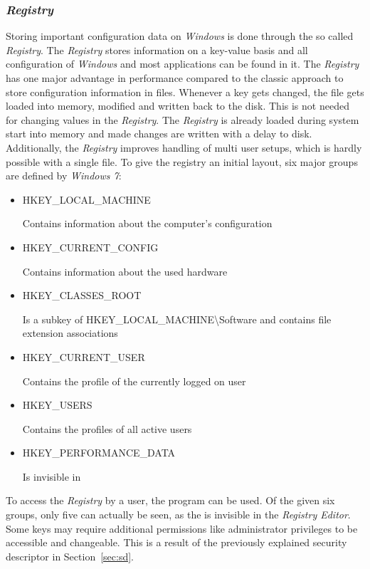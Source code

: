 \subsubsection{\emph{Registry}}
Storing important configuration data on \emph{Windows} is done through the so called \emph{Registry}. The \emph{Registry} stores information on a key-value basis and all configuration of \emph{Windows} and most applications can be found in it. The \emph{Registry} has one major advantage in performance compared to the classic approach to store configuration information in  files. Whenever a key gets changed, the  file gets loaded into memory, modified and written back to the disk. This is not needed for changing values in the \emph{Registry}. The \emph{Registry} is already loaded during system start into memory and made changes are written with a delay to disk. Additionally, the \emph{Registry} improves handling of multi user setups, which is hardly possible with a single  file. To give the registry an initial layout, six major groups are defined by \emph{Windows 7}:
\begin{itemize}
\label{sec:registrykeys}
\item HKEY\_LOCAL\_MACHINE

Contains information about the computer's configuration
\item HKEY\_CURRENT\_CONFIG

Contains information about the used hardware
\item HKEY\_CLASSES\_ROOT

Is a subkey of HKEY\_LOCAL\_MACHINE\textbackslash Software and contains file extension associations
\item HKEY\_CURRENT\_USER 

Contains the profile of the currently logged on user
\item HKEY\_USERS

Contains the profiles of all active users
\item HKEY\_PERFORMANCE\_DATA

Is invisible in 
\end{itemize}
To access the \emph{Registry} by a user, the  \cite{msdn_regedit} program can be used. Of the given six groups, only five can actually be seen, as the  is invisible in the \emph{Registry Editor}. Some keys may require additional permissions like administrator privileges to be accessible and changeable. This is a result of the previously explained security descriptor in Section~\ref{sec:sd}.